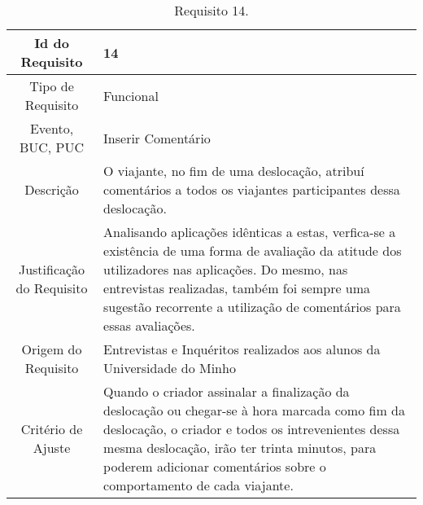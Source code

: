 \begin{table}[H]
\begin{center}
  \begin{tabularx}{\textwidth}{ | c | X | }
    \hline
    Id do Requisito & 14  \\
    
    \hline
    Tipo de Requisito & Funcional \\
    
    \hline
    Evento, BUC, PUC &  Inserir Comentário\\
    
    \hline
    Descrição & O viajante, no fim de uma deslocação, atribuí comentários a todos os viajantes participantes dessa deslocação.\\
    
    \hline
    Justificação do Requisito & Analisando aplicações idênticas a estas, verfica-se a existência de uma forma de avaliação da atitude dos utilizadores nas aplicações. Do mesmo, nas entrevistas realizadas, também foi sempre uma sugestão recorrente a utilização de comentários para essas avaliações.  \\
    
    \hline
    Origem do Requisito & Entrevistas e Inquéritos realizados aos alunos da Universidade do Minho \\
    
    \hline
    Critério de Ajuste & Quando o criador assinalar a finalização da deslocação ou chegar-se à hora marcada como fim da deslocação, o criador e todos os intrevenientes dessa mesma deslocação, irão ter trinta minutos, para poderem adicionar comentários sobre o comportamento de cada viajante.  \\
    
    \hline
  \end{tabularx}
  \caption{Requisito 14.} \label{tab:r3}
\end{center}
\end{table}

